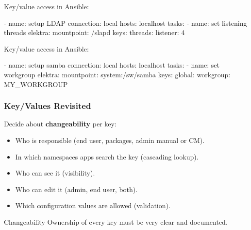 \begin{frame}[fragile]
	Key/value access in Ansible:
	\vspace{0.5cm}

	\begin{code}[morekeywords={name,connection,key,value,elektra,mountpoint,file,plugins,hosts,tasks},gobble=4]
	- name: setup LDAP
	  connection: local
	  hosts: localhost
	  tasks:
	  - name: set listening threads
	    elektra:
	      mountpoint: /slapd
	      keys:
	        threads:
	          listener: 4
	\end{code}
\end{frame}


\begin{frame}[fragile]
	Key/value access in Ansible:

	\begin{code}[morekeywords={name,connection,key,value,elektra,mountpoint,file,plugins,hosts,tasks},gobble=4]
	- name: setup samba
	  connection: local
	  hosts: localhost
	  tasks:
	  - name: set workgroup
	    elektra:
	      mountpoint: system:/sw/samba
	      keys:
	        global:
	          workgroup: MY_WORKGROUP
	\end{code}
\end{frame}

\begin{frame}
	\frametitle{Key/Values Revisited}

	Decide about \textbf{changeability} per key:

	\begin{itemize}[<+-| alert@+>]
	\item Who is responsible (end user, packages, admin manual or CM).
	\item In which namespaces apps search the key (cascading lookup).
	\item Who can see it (visibility).
	\item Who can edit it (admin, end user, both).
	\item Which configuration values are allowed (validation).
	\end{itemize}

	\pause[\thebeamerpauses]  %

	\begin{alertblock}{Changeability}
	Ownership of every key must be very clear and documented.
	\end{alertblock}
\end{frame}

